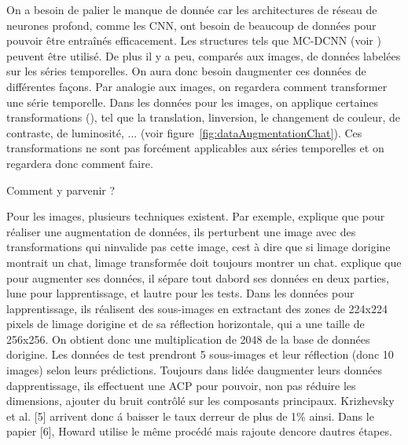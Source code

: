 \documentclass[11pt]{sdm}
\begin{document}
			On a besoin de palier le manque de donn\'ee car les architectures de r\'eseau de neurones profond, comme les CNN, ont besoin de beaucoup de donn\'ees pour pouvoir \^etre entra\^in\'es efficacement. Les structures tels que MC-DCNN (voir \cite{zheng2014time}) peuvent \^etre utilis\'e.
			De plus il y a peu, compar\'es aux images, de donn\'ees label\'ees sur les s\'eries temporelles. On aura donc besoin d\textquotesingle augmenter ces donn\'ees de diff\'erentes fa\c cons.
			Par analogie aux images, on regardera comment transformer une s\'erie temporelle. Dans les donn\'ees pour les images, on applique certaines transformations (\cite{krizhevsky2012imagenet,howard2013some}), tel que la translation, l\textquotesingle inversion, le changement de couleur, de contraste, de luminosit\'e, ... (voir figure~\ref{fig:dataAugmentationChat}). Ces transformations ne sont pas forc\'ement applicables aux s\'eries temporelles et on regardera donc comment faire.

			\medbreak

			\begin{itshape}{Comment y parvenir ?}\end{itshape}
			
			Pour les images, plusieurs techniques existent. Par exemple, \cite{chatfield2014return} explique que pour r\'ealiser une augmentation de donn\'ees, ils perturbent une image avec des transformations qui n\textquotesingle invalide pas cette image, c\textquotesingle est \`a dire que si l\textquotesingle image d\textquotesingle origine montrait un chat, l\textquotesingle image transform\'ee doit toujours montrer un chat. \cite{krizhevsky2012imagenet} explique que pour augmenter ses donn\'ees, il s\'epare tout d\textquotesingle abord ses donn\'ees en deux parties, l\textquotesingle une pour l\textquotesingle apprentissage, et l\textquotesingle autre pour les tests. Dans les donn\'ees pour l\textquotesingle apprentissage, ils r\'ealisent des sous-images en extractant des zones de 224x224 pixels de l\textquotesingle image d\textquotesingle origine et de sa r\'eflection horizontale, qui a une taille de 256x256. On obtient donc une multiplication de 2048 de la base de donn\'ees d\textquotesingle origine. Les donn\'ees de test prendront 5 sous-images et leur r\'eflection (donc 10 images) selon leurs pr\'edictions. Toujours dans l\textquotesingle id\'ee d\textquotesingle augmenter leurs donn\'ees d\textquotesingle apprentissage, ils effectuent une ACP pour pouvoir, non pas r\'eduire les dimensions, ajouter du bruit contr\^ol\'e sur les composants principaux. Krizhevsky et al. [5] arrivent donc \'a baisser le taux d\textquotesingle erreur de plus de 1\% ainsi. Dans le papier [6], Howard utilise le m\^eme proc\'ed\'e mais rajoute d\textquotesingle encore d\textquotesingle autres \'etapes. 
\end{document}
